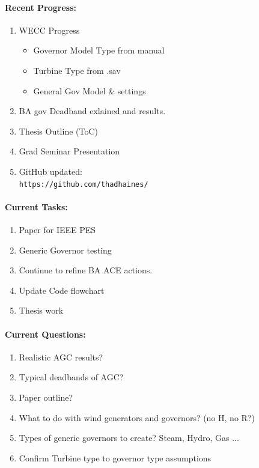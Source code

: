 \documentclass[12pt]{article}
\begin{document}
\begin{multicols}{2}
\raggedright
	\paragraph{Recent Progress:}
	\begin{enumerate}
		\item WECC Progress
		\begin{itemize}
			\item Governor Model Type from manual
			\item Turbine Type from .sav
			\item General Gov Model \& settings
		\end{itemize}

		\item BA gov Deadband exlained and results.
		\item Thesis Outline (ToC)
		\item Grad Seminar Presentation


		\item GitHub updated:\\
		\verb|https://github.com/thadhaines/|
		
	\end{enumerate}
\paragraph{Current Tasks:}
	\begin{enumerate}
		
		\item Paper for IEEE PES
		\item Generic Governor testing
		\item Continue to refine BA ACE actions.
		\item Update Code flowchart%
		\item Thesis work 
		

	\end{enumerate}

	\paragraph{Current Questions:}
	\begin{enumerate}
	\item Realistic AGC results?
	\item Typical deadbands of AGC? 
	\item Paper outline?
	\item What to do with wind generators and governors? (no H, no R?)
	\item Types of generic governors to create? Steam, Hydro, Gas ...
	\item Confirm Turbine type to governor type assumptions
	\end{enumerate}
	

\end{multicols}
\end{document}
